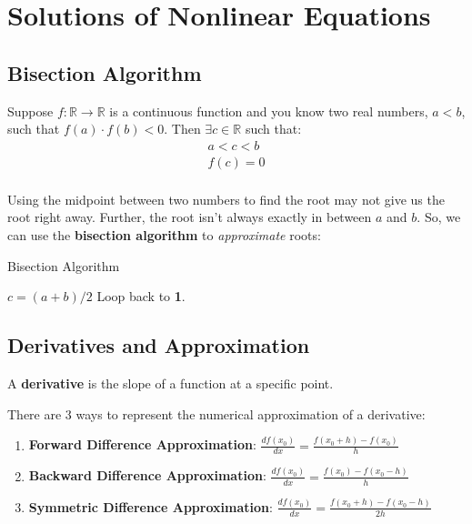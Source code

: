 \setcounter{chapter}{10}
\setcounter{lecture}{17}
\chapter{Solutions of Nonlinear Equations}
\section{Bisection Algorithm}

\begin{theorem}
	Suppose \(f: \mathbb{R} \to \mathbb{R}\) is a continuous function and you know two real numbers, \(a < b\), such that \(f(a) \cdot f(b) < 0\). Then \(\exists c \in \mathbb{R}\) such that:
	\begin{align*}
		a < c < b \\
		f(c) = 0 \\
	\end{align*} 
\end{theorem}

Using the midpoint between two numbers to find the root may not give us the root right away. Further, the root isn't always exactly in between \(a\) and \(b\). So, we can use the \textbf{bisection algorithm} to \emph{approximate} roots:

\begin{algorithm}[H]\label{BisectionAlgorithm}
	\DontPrintSemicolon
	\caption{Bisection Algorithm}
	\(c = (a + b) / 2\)\;
	Loop back to \textbf{1}.
\end{algorithm}

\section{Derivatives and Approximation}

\begin{definition}[Derivative]
	A \textbf{derivative} is the slope of a function at a specific point.
\end{definition}

There are 3 ways to represent the numerical approximation of a derivative:
\begin{enumerate}
	\item \textbf{Forward Difference Approximation}: \(\frac{df(x_0)}{dx} = \frac{f(x_0 + h) - f(x_0)}{h}\)
	\item \textbf{Backward Difference Approximation}: \(\frac{df(x_0)}{dx} = \frac{f(x_0) - f(x_0 - h)}{h}\)
	\item \textbf{Symmetric Difference Approximation}: \(\frac{df(x_0)}{dx} = \frac{f(x_0 + h) - f(x_0 - h)}{2h}\)  
\end{enumerate}

